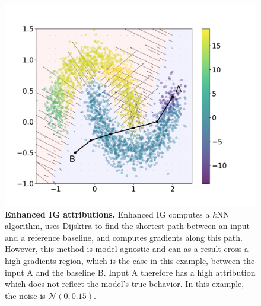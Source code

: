 \begin{figure}[ht]
\vskip -0.2in
\begin{center}
\centerline{\includegraphics[width=\columnwidth]{figures/enhanced_ig_y.pdf}}
\caption{\textbf{Enhanced IG attributions.} Enhanced IG computes a $k$NN algorithm, uses Dijsktra to find the shortest path between an input and a reference baseline, and computes gradients along this path. However, this method is model agnostic and can as a result cross a high gradients region, which is the case in this example, between the input A and the baseline B. Input A therefore has a high attribution which does not reflect the model's true behavior. In this example, the noise is $\mathcal{N}(0, 0.15)$.}
\label{fig:enhanced_ig}
\end{center}
\vskip -0.2in
\end{figure}

